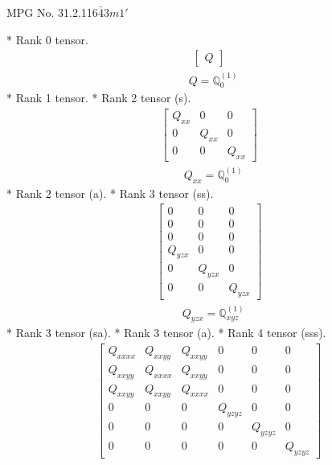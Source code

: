\documentclass[fleqn,8pt,landscape]{jsarticle}
\begin{document}
\setcounter{MaxMatrixCols}{32}

\renewcommand{\tablename}{Table~}
\renewcommand{\figurename}{Figure~}
\begin{center}
\LARGE
MPG No. 31.2.116\quad$\bar{4}3m1'$
\end{center}
* Rank 0 tensor.
\begin{align*}
\begin{bmatrix} Q \end{bmatrix}
\end{align*}
\begin{align*}
& Q = \mathbb{Q}_{0}^{(1)}
\end{align*}
* Rank 1 tensor.
* Rank 2 tensor (s).
\begin{align*}
\begin{bmatrix} Q_{xx} & 0 & 0 \\ 0 & Q_{xx} & 0 \\ 0 & 0 & Q_{xx} \end{bmatrix}
\end{align*}
\begin{align*}
& Q_{xx} = \mathbb{Q}_{0}^{(1)}
\end{align*}
* Rank 2 tensor (a).
* Rank 3 tensor (ss).
\begin{align*}
\begin{bmatrix} 0 & 0 & 0 \\ 0 & 0 & 0 \\ 0 & 0 & 0 \\ Q_{yzx} & 0 & 0 \\ 0 & Q_{yzx} & 0 \\ 0 & 0 & Q_{yzx} \end{bmatrix}
\end{align*}
\begin{align*}
& Q_{yzx} = \mathbb{Q}_{xyz}^{(1)}
\end{align*}
* Rank 3 tensor (sa).
* Rank 3 tensor (a).
* Rank 4 tensor (sss).
\begin{align*}
\begin{bmatrix} Q_{xxxx} & Q_{xxyy} & Q_{xxyy} & 0 & 0 & 0 \\ Q_{xxyy} & Q_{xxxx} & Q_{xxyy} & 0 & 0 & 0 \\ Q_{xxyy} & Q_{xxyy} & Q_{xxxx} & 0 & 0 & 0 \\ 0 & 0 & 0 & Q_{yzyz} & 0 & 0 \\ 0 & 0 & 0 & 0 & Q_{yzyz} & 0 \\ 0 & 0 & 0 & 0 & 0 & Q_{yzyz} \end{bmatrix}
\end{align*}
\end{document}
